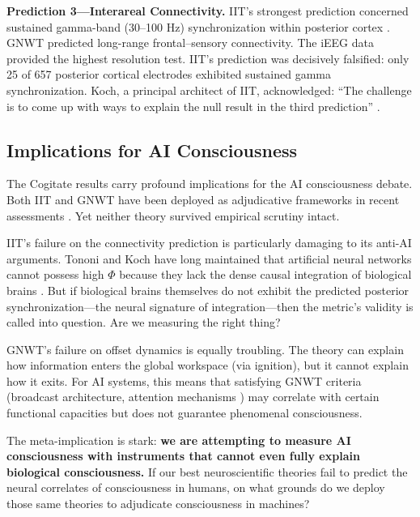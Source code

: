 \textbf{Prediction 3---Interareal Connectivity.} IIT's strongest prediction concerned
sustained gamma-band (30--100 Hz) synchronization within posterior cortex
\cite{tononi2016integrated, oizumi2014phenomenology}. GNWT predicted long-range
frontal--sensory connectivity. The iEEG data provided the highest resolution test. IIT's
prediction was decisively falsified: only 25 of 657 posterior cortical electrodes exhibited
sustained gamma synchronization. Koch, a principal architect of IIT, acknowledged:
``The challenge is to come up with ways to explain the null result in the third prediction''
\cite{ferrante2025adversarial}.

\subsection{Implications for AI Consciousness}

The Cogitate results carry profound implications for the AI consciousness debate. Both IIT
and GNWT have been deployed as adjudicative frameworks in recent assessments
\cite{butlin2023consciousness, shin2025iit, goldstein2024case}. Yet neither theory survived
empirical scrutiny intact.

IIT's failure on the connectivity prediction is particularly damaging to its anti-AI
arguments. Tononi and Koch have long maintained that artificial neural networks cannot possess
high $\Phi$ because they lack the dense causal integration of biological brains
\cite{tononi2016integrated}. But if biological brains themselves do not exhibit the predicted
posterior synchronization---the neural signature of integration---then the metric's validity
is called into question. Are we measuring the right thing?

GNWT's failure on offset dynamics is equally troubling. The theory can explain how
information enters the global workspace (via ignition), but it cannot explain how it exits.
For AI systems, this means that satisfying GNWT criteria (broadcast architecture, attention
mechanisms \cite{vaswani2017attention}) may correlate with certain functional capacities but
does not guarantee phenomenal consciousness.

The meta-implication is stark: \textbf{we are attempting to measure AI consciousness with
instruments that cannot even fully explain biological consciousness.} If our best
neuroscientific theories fail to predict the neural correlates of consciousness in humans,
on what grounds do we deploy those same theories to adjudicate consciousness in machines?

